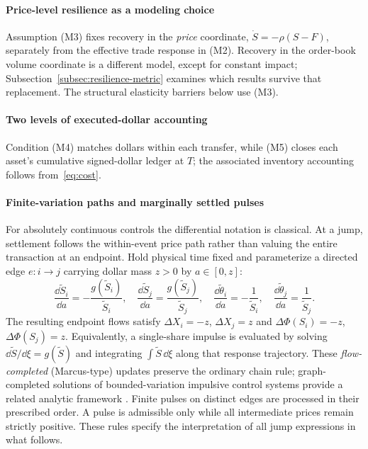 \documentclass[review,hidelinks,onefignum,onetabnum]{siamonline250211}
\begin{document}
\paragraph{Price-level resilience as a modeling choice}
Assumption (M3) fixes recovery in the \emph{price} coordinate,
$\dot S=-\rho(S-F)$, separately from the effective trade response in (M2).
Recovery in the order-book volume coordinate is a different model,
except for constant impact; Subsection~\ref{subsec:resilience-metric}
examines which results survive that replacement. The structural
elasticity barriers below use (M3).

\paragraph{Two levels of executed-dollar accounting}
Condition (M4) matches dollars within each transfer, while
(M5) closes each asset's cumulative signed-dollar ledger
at $T$; the associated inventory accounting follows from~\eqref{eq:cost}.

\paragraph{Finite-variation paths and marginally settled pulses}
For absolutely continuous controls the differential notation is classical. At a jump, settlement follows the within-event price path rather than valuing the entire transaction at an endpoint. Hold physical time fixed and parameterize a directed edge $e:i\to j$ carrying dollar mass $z>0$ by $a\in[0,z]$:
\begin{equation}\label{eq:pulse-flow}
\frac{\dd \widetilde S_i}{\dd a}=-\frac{g(\widetilde S_i)}{\widetilde S_i},\quad
\frac{\dd \widetilde S_j}{\dd a}=\frac{g(\widetilde S_j)}{\widetilde S_j},\quad
\frac{\dd\widetilde\theta_i}{\dd a}=-\frac{1}{\widetilde S_i},\quad
\frac{\dd\widetilde\theta_j}{\dd a}=\frac{1}{\widetilde S_j}.
\end{equation}
The resulting endpoint flows satisfy $\Delta X_i=-z$, $\Delta X_j=z$ and $\Delta\Phi(S_i)=-z$, $\Delta\Phi(S_j)=z$. Equivalently, a single-share impulse is evaluated by solving $\dd\widetilde S/\dd\xi=g(\widetilde S)$ and integrating $\int\widetilde S\,\dd\xi$ along that response trajectory. These \emph{flow-completed} (Marcus-type) updates preserve the ordinary chain rule; graph-completed solutions of bounded-variation impulsive control systems provide a related analytic framework \citep{BressanRampazzo1988}. Finite pulses on distinct edges are processed in their prescribed order. A pulse is admissible only while all intermediate prices remain strictly positive. These rules specify the interpretation of all jump expressions in what follows.
\end{document}

